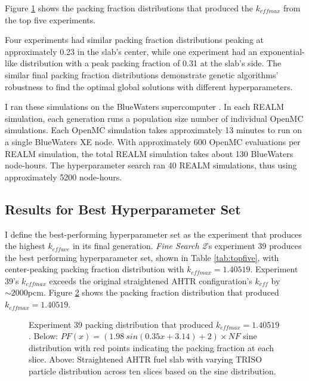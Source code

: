 Figure \ref{fig:topfiveplot} shows the packing fraction distributions that 
produced the $k_{eff max}$ from the top five experiments. 
\begin{figure}[]
    \centering
    \caption{}
    \label{fig:topfiveplot}
\end{figure}
Four experiments had similar packing fraction distributions peaking at approximately 
0.23 in the slab's center, while one experiment had an exponential-like 
distribution with a peak packing fraction of 0.31 at the slab's side.
The similar final packing fraction distributions demonstrate genetic algorithms' 
robustness to find the optimal global solutions with different hyperparameters. 

I ran these simulations on the BlueWaters supercomputer \cite{ncsa_about_2017}. 
In each \gls{REALM} simulation, each generation runs a population size number 
of individual OpenMC simulations. 
Each OpenMC simulation takes approximately 13 minutes to run on a single BlueWaters 
XE node. 
With approximately 600 OpenMC evaluations per \gls{REALM} simulation, the total 
\gls{REALM} simulation takes about 130 BlueWaters node-hours. 
The hyperparameter search ran 40 \gls{REALM} simulations, thus using approximately
5200 node-hours.

\subsection{Results for Best Hyperparameter Set}
I define the best-performing hyperparameter set as the experiment that produces 
the highest $k_{eff ave}$ in its final generation. 
\textit{Fine Search 2}'s experiment 39 produces the best performing 
hyperparameter set, shown in Table \ref{tab:topfive}, with 
center-peaking packing fraction distribution with $k_{eff max} = 1.40519$. 
Experiment 39's $k_{eff max}$ exceeds the original straightened \gls{AHTR} 
configuration's $k_{eff}$ by $\sim2000$pcm. 
Figure \ref{fig:triso_distribution_sine_39} shows the packing fraction distribution 
that produced $k_{eff max} = 1.40519$. 
\begin{figure}[]
    \centering
    \caption{Experiment 39 packing distribution that produced $k_{eff max} = 1.40519$. 
    Below: $PF(x) = (1.98\ sin(0.35x+3.14)+2)  \times NF$ sine distribution with 
    red points indicating the packing fraction at each slice. 
    Above: Straightened \acrfull{AHTR} fuel slab with varying \gls{TRISO} particle 
    distribution across ten slices based on the sine distribution. }
    \label{fig:triso_distribution_sine_39}
\end{figure}

